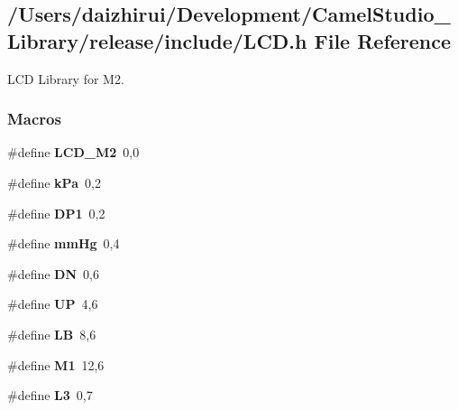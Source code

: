 \hypertarget{a00017}{}\subsection{/\+Users/daizhirui/\+Development/\+Camel\+Studio\+\_\+\+Library/release/include/\+L\+CD.h File Reference}
\label{a00017}


L\+CD Library for M2.  


\subsubsection*{Macros}
\begin{DoxyCompactItemize}
\item 
\mbox{\label{a00017_a4af5427d9aa90c7448319d8d671ed934}} 
\#define {\bfseries L\+C\+D\+\_\+\+M2}~0,0
\item 
\mbox{\label{a00017_a1af9bfb776e912a8ed058f35aec8de6f}} 
\#define {\bfseries k\+Pa}~0,2
\item 
\mbox{\label{a00017_a9619bed778bac3de065a9a15bfd70b02}} 
\#define {\bfseries D\+P1}~0,2
\item 
\mbox{\label{a00017_a8dea6b4b81cf2b2d63ad7c849a3e9e57}} 
\#define {\bfseries mm\+Hg}~0,4
\item 
\mbox{\label{a00017_ad6ebbc68b0071f082925e51e4f2bd9a8}} 
\#define {\bfseries DN}~0,6
\item 
\mbox{\label{a00017_a1965eaca47dbf3f87acdafc2208f04eb}} 
\#define {\bfseries UP}~4,6
\item 
\mbox{\label{a00017_acc55daa58d88a3612f2ef74a6abbe97f}} 
\#define {\bfseries LB}~8,6
\item 
\mbox{\label{a00017_ac597abe7cf610f262f7aaec53ed1d413}} 
\#define {\bfseries M1}~12,6
\item 
\mbox{\label{a00017_a7771a73a8014204aeeecaaf58527b670}} 
\#define {\bfseries L3}~0,7
\item 

\end{DoxyCompactItemize}
